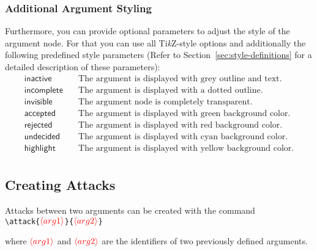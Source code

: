 \documentclass[headings=normal]{scrartcl}
\newcommand{\tikzname}{Ti\emph{k}Z\xspace}
\newcommand{\opt}[2][red]{\ensuremath{\textcolor{#1}{\langle #2\rangle}}}
\begin{document}
\subsubsection{Additional Argument Styling}
    Furthermore, you can provide optional parameters to adjust the style of the argument node.
    For that you can use all \tikzname-style options and additionally the following predefined style parameters (Refer to Section~\ref{sec:style-definitions} for a detailed description of these parameters):
    \begin{align*}
        \mathsf{inactive} &\quad \text{The argument is displayed with grey outline and text.}\\
        \mathsf{incomplete} &\quad \text{The argument is displayed with a dotted outline.}\\
        \mathsf{invisible} &\quad \text{The argument node is completely transparent.}\\
        \mathsf{accepted} &\quad \text{The argument is displayed with green background color.}\\
        \mathsf{rejected} &\quad \text{The argument is displayed with red background color.}\\
        \mathsf{undecided} &\quad \text{The argument is displayed with cyan background color.}\\
        \mathsf{highlight} &\quad \text{The argument is displayed with yellow background color.}\\
    \end{align*}
    

\subsection{Creating Attacks}
    Attacks between two arguments can be created with the command\\

    \noindent
    \verb|\attack{|\opt{arg1}\verb|}{|\opt{arg2}\verb|}|

    \begin{list}{}{\leftmargin=\parindent\rightmargin=0pt}
        \item where \opt{arg1} and \opt{arg2} are the identifiers of two previously defined arguments.
    \end{list}

    
\end{document}
